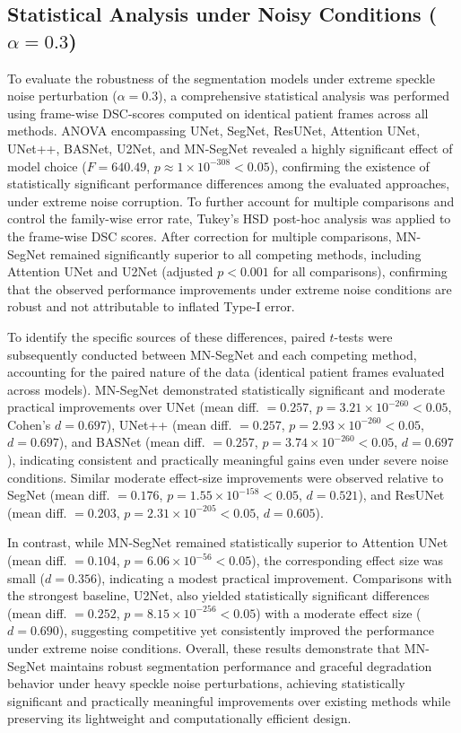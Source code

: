 \documentclass[12pt,letterpaper]{article}
\begin{document}
\subsection{Statistical Analysis under Noisy Conditions ($\alpha = 0.3$)}

To evaluate the robustness of the segmentation models under extreme speckle noise
perturbation ($\alpha = 0.3$), a comprehensive statistical analysis was performed
using frame-wise DSC-scores computed on identical patient frames across all
methods. ANOVA encompassing UNet, SegNet,
ResUNet, Attention UNet, UNet++, BASNet, U2Net, and MN-SegNet revealed a highly
significant effect of model choice ($F = 640.49$, $p \approx 1 \times 10^{-308} < 0.05$),
confirming the existence of statistically significant performance differences
among the evaluated approaches, under extreme noise corruption. To further account for multiple comparisons and control the family-wise error
rate, Tukey’s HSD post-hoc analysis was applied to the frame-wise DSC scores.
After correction for multiple comparisons, MN-SegNet remained significantly
superior to all competing methods, including Attention UNet and U2Net
(adjusted $p < 0.001$ for all comparisons), confirming that the observed
performance improvements under extreme noise conditions are robust and not
attributable to inflated Type-I error.

To identify the specific sources of these differences, paired $t$-tests were
subsequently conducted between MN-SegNet and each competing method, accounting
for the paired nature of the data (identical patient frames evaluated across
models). MN-SegNet demonstrated statistically significant and moderate practical
improvements over UNet (mean diff. $= 0.257$, $p = 3.21 \times 10^{-260}< 0.05$,
Cohen’s $d = 0.697$), UNet++ (mean diff. $= 0.257$, $p = 2.93 \times
10^{-260}< 0.05$, $d = 0.697$), and BASNet (mean diff. $= 0.257$, $p = 3.74 \times
10^{-260}< 0.05$, $d = 0.697$), indicating consistent and practically meaningful gains
even under severe noise conditions. Similar moderate effect-size improvements
were observed relative to SegNet (mean diff. $= 0.176$, $p = 1.55 \times
10^{-158}< 0.05$, $d = 0.521$), and ResUNet (mean diff. $= 0.203$, $p = 2.31 \times
10^{-205}< 0.05$, $d = 0.605$).



In contrast, while MN-SegNet remained statistically superior to Attention UNet
(mean diff. $= 0.104$, $p = 6.06 \times 10^{-56}< 0.05$), the corresponding effect
size was small ($d = 0.356$), indicating a modest practical improvement.
Comparisons with the strongest baseline, U2Net, also yielded statistically
significant differences (mean diff. $= 0.252$, $p = 8.15 \times 10^{-256}< 0.05$)
with a moderate effect size ($d = 0.690$), suggesting competitive yet
consistently improved the performance under extreme noise conditions. Overall, these
results demonstrate that MN-SegNet maintains robust segmentation performance and
graceful degradation behavior under heavy speckle noise perturbations, achieving
statistically significant and practically meaningful improvements over existing
methods while preserving its lightweight and computationally efficient design.
\end{document}

